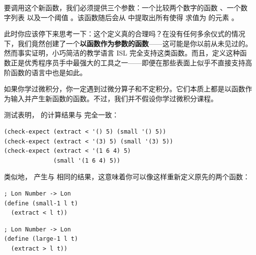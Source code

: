要调用这个新函数，我们必须提供三个参数：一个比较两个数字的函数 、一个数字列表  以及一个阈值 。该函数随后会从  中提取出所有使得  求值为  的元素 。

\begin{notebox}
此时你应该停下来思考一下：这个定义真的合理吗？在没有任何多余仪式的情况下，我们竟然创建了一个\textbf{以函数作为参数的函数}——这可能是你以前从未见过的。然而事实证明，小巧简洁的教学语言 ISL 完全支持这类函数。而且，定义这种函数正是优秀程序员手中最强大的工具之一——即便在那些表面上似乎不直接支持高阶函数的语言中也是如此。
\end{notebox}

\begin{notebox}[微积分中的高阶函数]
如果你学过微积分，你一定遇到过微分算子和不定积分。它们本质上都是以函数作为输入并产生新函数的函数。不过，我们并不假设你学过微积分课程。
\end{notebox}

测试表明， 的计算结果与  完全一致：

\begin{lstlisting}[language=BSL]
(check-expect (extract < '() 5) (small '() 5))
(check-expect (extract < '(3) 5) (small '(3) 5))
(check-expect (extract < '(1 6 4) 5)
              (small '(1 6 4) 5))
\end{lstlisting}

类似地， 产生与  相同的结果，这意味着你可以像这样重新定义原先的两个函数：

\begin{stepperbox}
  \noindent\begin{minipage}[t]{0.48\linewidth}\vspace{0pt}
\begin{Verbatim}[commandchars=\\\{\}, fontsize=\fontsize{6.0pt}{7.2pt}\selectfont]
; Lon Number -> Lon
(define (small-1 l t)
  (extract < l t))
\end{Verbatim}
  \end{minipage}\hfill
  \begin{minipage}[t]{0.48\linewidth}\vspace{0pt}
\begin{Verbatim}[commandchars=\\\{\}, fontsize=\fontsize{6.0pt}{7.2pt}\selectfont]
; Lon Number -> Lon
(define (large-1 l t)
  (extract > l t))
\end{Verbatim}
  \end{minipage}
\end{stepperbox}


